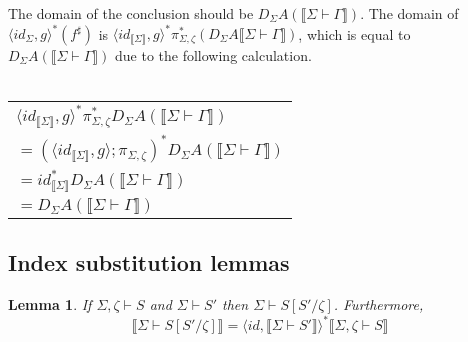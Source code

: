 \documentclass{article}
\newtheorem{lemma}{Lemma}
\newcommand{\sem}[1]{\llbracket #1 \rrbracket}
\begin{document}
\subsubsection*{}

The domain of the conclusion should be $D_{\Sigma}A(\sem{\Sigma \vdash \Gamma})$. The domain of $\langle \mathit{id}_{\Sigma}, g \rangle^*(f^\sharp)$ is $\langle \mathit{id}_{\sem{\Sigma}}, g \rangle^* \pi_{\Sigma,\zeta}^*(D_{\Sigma} A \sem{\Sigma \vdash \Gamma})$, which is equal to $D_{\Sigma}A(\sem{\Sigma \vdash \Gamma})$ due to the following calculation.\\~\\
\begin{tabu}{l}
$\langle \mathit{id}_{\sem{\Sigma}}, g \rangle^* \pi_{\Sigma,\zeta}^* D_{\Sigma} A (\sem{\Sigma \vdash \Gamma})$ \\
$= (\langle \mathit{id}_{\sem{\Sigma}}, g \rangle; \pi_{\Sigma,\zeta})^* D_{\Sigma} A (\sem{\Sigma \vdash \Gamma})$ \\
$= id_{\sem{\Sigma}}^* D_{\Sigma} A (\sem{\Sigma \vdash \Gamma})$ \\
$= D_{\Sigma} A (\sem{\Sigma \vdash \Gamma})$
\end{tabu}

\subsection*{Index substitution lemmas}

\begin{lemma}
If $\Sigma,\zeta \vdash S$ and $\Sigma \vdash S'$ then $\Sigma \vdash S[S'/\zeta]$. Furthermore, $$\sem{\Sigma \vdash S[S'/\zeta]} = \langle \mathit{id}, \sem{\Sigma \vdash S'} \rangle^* \sem{\Sigma,\zeta \vdash S}$$
\label{SWF-Subst}
\end{lemma}
\end{document}
